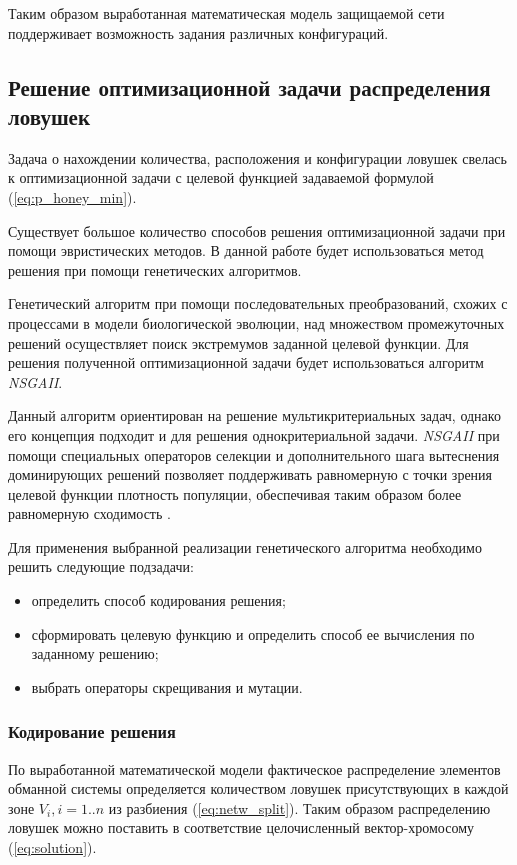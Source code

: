 Таким образом выработанная математическая модель защищаемой сети поддерживает возможность задания различных конфигураций.

\subsection{Решение оптимизационной задачи распределения ловушек}

Задача о нахождении количества, расположения и конфигурации ловушек свелась к оптимизационной задачи с целевой функцией задаваемой формулой (\ref{eq:p_honey_min}).

Существует большое количество способов решения оптимизационной задачи при помощи эвристических методов. В данной работе будет использоваться метод решения при помощи генетических алгоритмов.

Генетический алгоритм при помощи последовательных преобразований, схожих с процессами в модели биологической эволюции, над множеством промежуточных решений осуществляет поиск экстремумов заданной целевой функции. Для решения полученной оптимизационной задачи будет использоваться алгоритм \textit{NSGAII}. 

Данный алгоритм ориентирован на решение мультикритериальных задач, однако его концепция подходит и для решения однокритериальной задачи. \textit{NSGAII} при помощи специальных операторов селекции и дополнительного шага вытеснения доминирующих решений позволяет поддерживать равномерную с точки зрения целевой функции плотность популяции, обеспечивая таким образом более равномерную сходимость \citep{NSGA2002}.

Для применения выбранной реализации генетического алгоритма необходимо решить следующие подзадачи:
\begin{itemize}
	\item определить способ кодирования решения;
	\item сформировать целевую функцию и определить способ ее вычисления по заданному решению;
	\item выбрать операторы скрещивания и мутации.
\end{itemize}

\subsubsection{Кодирование решения}\hspace*{\fill}

По выработанной математической модели фактическое распределение элементов обманной системы определяется количеством ловушек присутствующих в каждой зоне $V_i, i=1..n$ из разбиения (\ref{eq:netw_split}). Таким образом распределению ловушек можно поставить в соответствие целочисленный вектор-хромосому (\ref{eq:solution}).

